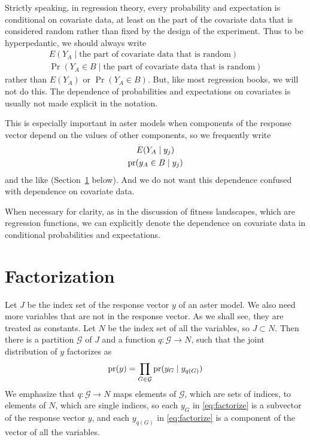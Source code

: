 Strictly speaking, in regression theory, every probability and expectation
is conditional on covariate data, at least on the part of the covariate data
that is considered random rather than fixed by the design of the experiment.
Thus to be hyperpedantic, we should always write
\begin{gather*}
   E(Y_A \mid \text{the part of covariate data that is random})
   \\
   \Pr(Y_A \in B \mid \text{the part of covariate data that is random})
\end{gather*}
rather than $E(Y_A)$ or $\Pr(Y_A \in B)$.  But, like most regression books,
we will not do this.  The dependence of probabilities and expectations on
covariates is usually not made explicit in the notation.

This is especially important in aster models when components of the response
vector depend on the values of other components, so we frequently write
\begin{gather*}
   E(Y_A \mid y_j)
   \\
   \operatorname{pr}(y_A \in B \mid y_j)
\end{gather*}
and the like (Section~\ref{sec:factorization} below).
And we do not want this dependence confused with dependence
on covariate data.

When necessary for clarity, as in the discussion of fitness landscapes,
which are regression functions,
we can explicitly denote the dependence on covariate data in conditional
probabilities and expectations.

\section{Factorization}
\label{sec:factorization}

Let $J$ be the index set of the response vector $y$ of an aster model.
We also need more variables that are not in the response vector.
As we shall see, they are treated as constants.
Let $N$ be the index set of all the variables, so $J \subset N$.
Then there is a partition $\mathcal{G}$ of $J$
and a function $q : \mathcal{G} \to N$, such that
the joint distribution of $y$ factorizes as
\begin{equation} \label{eq:factorize}
   \operatorname{pr}(y) = \prod_{G \in \mathcal{G}} \operatorname{pr}(y_G \mid y_{q(G)})
\end{equation}
We emphasize that $q : \mathcal{G} \to N$ maps elements of $\mathcal{G}$,
which are sets of indices, to elements of $N$, which are single indices,
so each $y_G$ in \eqref{eq:factorize} is a subvector of the response vector $y$,
and each $y_{q(G)}$ in \eqref{eq:factorize} is a component of the vector
of all the variables.

